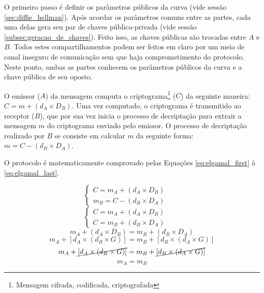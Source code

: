 \documentclass[12pt]{article}
\begin{document}
        O primeiro passo é definir os parâmetros públicos da curva (vide sessão \ref{sec:diffie_hellman}). Após acordar os parâmetros comuns entre as partes, cada uma delas gera seu par de chaves pública-privada (vide sessão \ref{subsec:geracao_de_chaves}). Feito isso, as chaves públicas são trocadas entre $A$ e $B$. Todos estes compartilhamentos podem ser feitos em claro por um meio de canal inseguro de comunicação sem que haja comprometimento do protocolo. Neste ponto, ambas as partes conhecem os parâmetros públicos da curva e a chave pública de seu oposto.

        O emissor ($A$) da mensagem computa o criptograma\footnote{Mensagem cifrada, codificada, criptografada} ($C$) da seguinte maneira: $C = m + (d_{A} \times D_{B})$. Uma vez computado, o criptograma é transmitido ao receptor ($B$), que por sua vez inicia o processo de decriptação para extrair a mensagem $m$ do criptograma enviado pelo emissor. O processo de decriptação realizado por $B$ se consiste em calcular $m$ da seguinte forma: $m = C - (d_{B} \times D_{A})$.
        
        \clearpage
        \newpage
        
        O protocolo é matematicamente comprovado pelas Equações \ref{eq:elgamal_first} à \ref{eq:elgamal_last}.

        \begin{equation}
        \label{eq:elgamal_first}
            \begin{cases}
                C = m_{A} + (d_{A} \times D_{B}) & \quad \\
                m_{B} = C - (d_{B} \times D_{A})
            \end{cases}
        \end{equation}
        \begin{equation}
            \begin{cases}
                C = m_{A} + (d_{A} \times D_{B}) & \quad \\
                C = m_{B} + (d_{B} \times D_{A})
            \end{cases}
        \end{equation}
        \begin{equation}
            m_{A} + (d_{A} \times D_{B}) = m_{B} + (d_{B} \times D_{A})
        \end{equation}
        \begin{equation}
            m_{A} + [d_{A} \times (d_{B} \times G)] = m_{B} + [d_{B} \times (d_{A} \times G)]
        \end{equation}
        \begin{equation}
            m_{A} + \cancel{[d_{A} \times (d_{B} \times G)]} = m_{B} + \cancel{[d_{B} \times (d_{A} \times G)]}
        \end{equation}
        \begin{equation}
        \label{eq:elgamal_last}
            m_{A} = m_{B}
        \end{equation}
\end{document}
